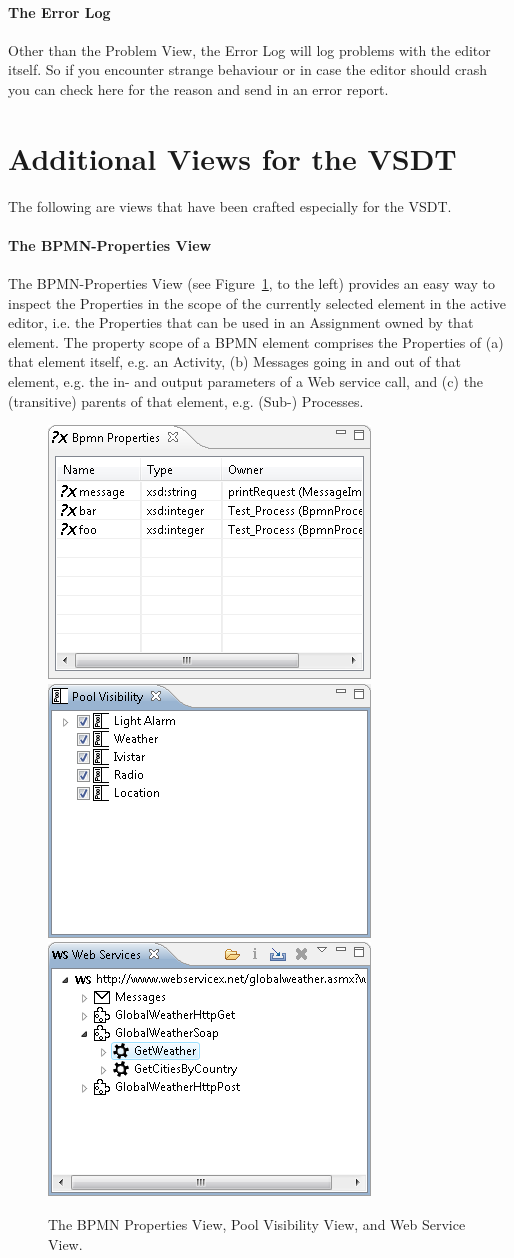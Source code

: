 \paragraph*{The Error Log}
Other than the Problem View, the Error Log will log problems with the editor itself. So if you
encounter strange behaviour or in case the editor should crash you can check here for the reason and
send in an error report.



\section{Additional Views for the VSDT}
\label{sec:user_perspective_custom}

The following are views that have been crafted especially for the VSDT.


\paragraph*{The BPMN-Properties View}
\label{sec:user_perspective_propView}

The BPMN-Properties View (see Figure~\ref{fig:customViews}, to the left) provides an easy way to
inspect the Properties in the scope of the currently selected element in the active editor, i.e. the
Properties that can be used in an Assignment owned by that element. The property scope of a BPMN
element comprises the Properties of (a) that element itself, e.g. an Activity, (b) Messages going in
and out of that element, e.g. the in- and output parameters of a Web service call, and (c) the
(transitive) parents of that element, e.g. (Sub-) Processes.

\begin{figure}[t]
	\centering
	\includegraphics[width=.3\textwidth]{figures/features/propView.png}
	\hspace{.5cm}
	\includegraphics[width=.3\textwidth]{figures/features/poolView.png}
	\hspace{.5cm}
	\includegraphics[width=.3\textwidth]{figures/features/wsView.png}
	\caption{The BPMN Properties View, Pool Visibility View, and Web Service View.}
	\label{fig:customViews}
\end{figure}

